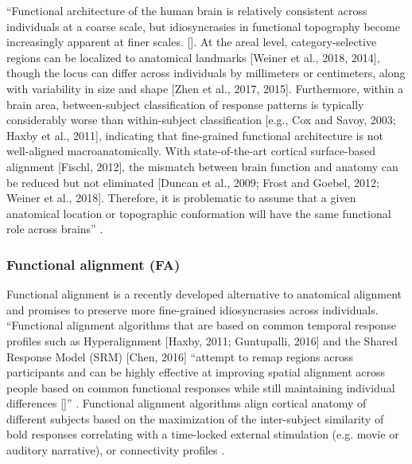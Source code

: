 ``Functional architecture of the human brain is relatively consistent across
individuals at a coarse scale, but idiosyncrasies in functional topography
become increasingly apparent at finer scales. []. At the areal level,
category-selective regions can be localized to anatomical landmarks [Weiner et
al., 2018, 2014], though the locus can differ across individuals by millimeters
or centimeters, along with variability in size and shape [Zhen et al., 2017,
2015]. Furthermore, within a brain area, between-subject classification of
response patterns is typically considerably worse than within-subject
classification [e.g., Cox and Savoy, 2003; Haxby et al., 2011], indicating that
fine-grained functional architecture is not well-aligned macroanatomically. With
state-of-the-art cortical surface-based alignment [Fischl, 2012], the mismatch
between brain function and anatomy can be reduced but not eliminated [Duncan et
al., 2009; Frost and Goebel, 2012; Weiner et al., 2018]. Therefore, it is
problematic to assume that a given anatomical location or topographic
conformation will have the same functional role across brains''
\citep{feilong2018reliable}.


\subsubsection{Functional alignment (FA)}


Functional alignment is a recently developed alternative to anatomical alignment
and promises to preserve more fine-grained idiosyncrasies across individuals.
%
``Functional alignment algorithms that are based on common temporal response
profiles such as Hyperalignment [Haxby, 2011; Guntupalli, 2016] and the Shared
Response Model (SRM) [Chen, 2016] ``attempt to remap regions across participants
and can be highly effective at improving spatial alignment across people based
on common functional responses while still maintaining individual differences
[\citep{feilong2018reliable}]'' \citep{chang2021endogenous}.
%
Functional alignment algorithms align cortical anatomy of different subjects
based on the maximization of the inter-subject similarity of \ac{bold} responses
\citep{haxby2011common, chen2015reduced, sabuncu2010function} correlating with a
time-locked external stimulation (e.g. movie or auditory narrative), or
connectivity profiles \citep{feilong2018reliable, guntupalli2018computational}.

